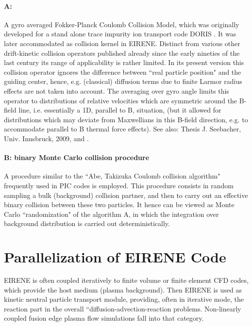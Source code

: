 \paragraph {A:}
A gyro averaged Fokker-Planck Coulomb Collision Model, which was originally
developed for a stand alone trace impurity ion transport code DORIS
\cite{kn:Doris,kn:Reiser98}. It was later accommodated as collision kernel in EIRENE.
Distinct from various other drift-kinetic collision operators published already since the early
nineties of the last century its range of applicability is rather limited.
In its present version this collision operator ignores the difference between
``real particle position" and the guiding center, hence, e.g. (classical) diffusion terms
due to finite Larmor radius effects are not taken into account. The averaging over gyro angle
limits this operator to
distributions of relative velocities which are symmetric around the B-field line, i.e. essentially a 1D, parallel to B, situation,
(but it allowed for distributions which may deviate from Maxwellians in this B-field direction,
e.g. to accommodate parallel to B thermal force effects).
See also: Thesis J. Seebacher, Univ. Innsbruck, 2009, and \cite{kn:Seebacher}.

\paragraph{B: binary Monte Carlo collision procedure}
A procedure similar to the ``Abe, Takizuka Coulomb collision algorithm" frequently used in PIC codes \cite{kn:Takizuka}
is employed. This procedure consists in random sampling  a bulk (background) collision partner, and then to carry out
an effective binary collision between these two particles. It hence can be viewed as Monte Carlo ``randomization"
of the algorithm A, in which the integration over background distribution is carried out deterministically.


\newpage
\section{Parallelization of EIRENE Code}
EIRENE is often coupled iteratively to finite volume or finite element CFD codes, which provide the host medium (plasma background).
Then EIRENE is used as kinetic neutral particle transport module,
providing, often in iterative mode, the reaction part in the overall
``diffusion-advection-reaction problems. Non-linearly coupled fusion edge plasma flow
simulations fall into that category.

